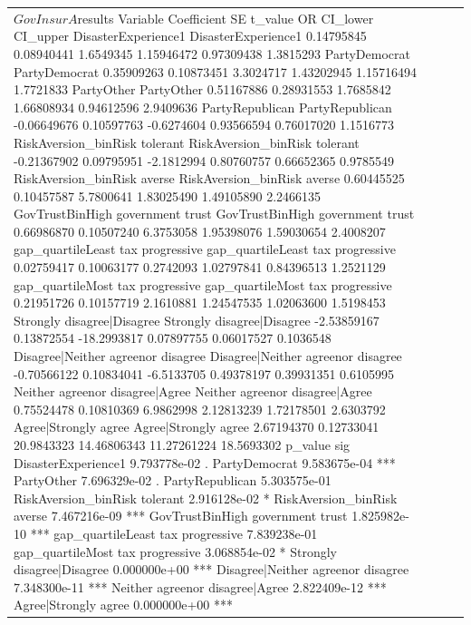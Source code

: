 \begin{table}[!h]
\begin{tabular}[t]{>{\raggedright\arraybackslash}p{6.4cm}ccc}
$GovInsurA$results
                                                             Variable Coefficient         SE     t_value          OR    CI_lower   CI_upper
DisasterExperience1                               DisasterExperience1  0.14795845 0.08940441   1.6549345  1.15946472  0.97309438  1.3815293
PartyDemocrat                                           PartyDemocrat  0.35909263 0.10873451   3.3024717  1.43202945  1.15716494  1.7721833
PartyOther                                                 PartyOther  0.51167886 0.28931553   1.7685842  1.66808934  0.94612596  2.9409636
PartyRepublican                                       PartyRepublican -0.06649676 0.10597763  -0.6274604  0.93566594  0.76017020  1.1516773
RiskAversion_binRisk tolerant           RiskAversion_binRisk tolerant -0.21367902 0.09795951  -2.1812994  0.80760757  0.66652365  0.9785549
RiskAversion_binRisk averse               RiskAversion_binRisk averse  0.60445525 0.10457587   5.7800641  1.83025490  1.49105890  2.2466135
GovTrustBinHigh government trust     GovTrustBinHigh government trust  0.66986870 0.10507240   6.3753058  1.95398076  1.59030654  2.4008207
gap_quartileLeast tax progressive   gap_quartileLeast tax progressive  0.02759417 0.10063177   0.2742093  1.02797841  0.84396513  1.2521129
gap_quartileMost tax progressive     gap_quartileMost tax progressive  0.21951726 0.10157719   2.1610881  1.24547535  1.02063600  1.5198453
Strongly disagree|Disagree                 Strongly disagree|Disagree -2.53859167 0.13872554 -18.2993817  0.07897755  0.06017527  0.1036548
Disagree|Neither agreenor disagree Disagree|Neither agreenor disagree -0.70566122 0.10834041  -6.5133705  0.49378197  0.39931351  0.6105995
Neither agreenor disagree|Agree       Neither agreenor disagree|Agree  0.75524478 0.10810369   6.9862998  2.12813239  1.72178501  2.6303792
Agree|Strongly agree                             Agree|Strongly agree  2.67194370 0.12733041  20.9843323 14.46806343 11.27261224 18.5693302
                                        p_value sig
DisasterExperience1                9.793778e-02   .
PartyDemocrat                      9.583675e-04 ***
PartyOther                         7.696329e-02   .
PartyRepublican                    5.303575e-01    
RiskAversion_binRisk tolerant      2.916128e-02   *
RiskAversion_binRisk averse        7.467216e-09 ***
GovTrustBinHigh government trust   1.825982e-10 ***
gap_quartileLeast tax progressive  7.839238e-01    
gap_quartileMost tax progressive   3.068854e-02   *
Strongly disagree|Disagree         0.000000e+00 ***
Disagree|Neither agreenor disagree 7.348300e-11 ***
Neither agreenor disagree|Agree    2.822409e-12 ***
Agree|Strongly agree               0.000000e+00 ***



\end{tabular}
\end{table}
